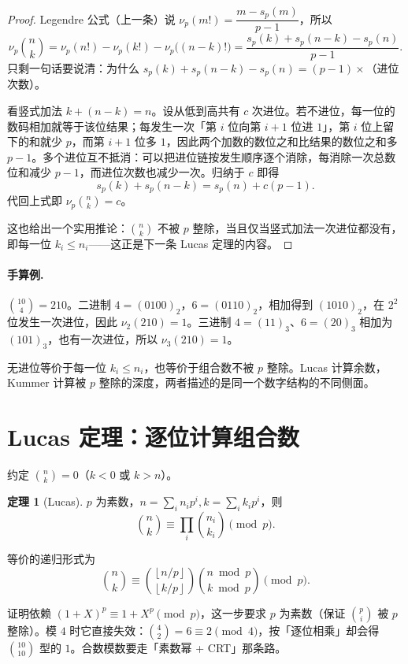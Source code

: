 \documentclass[UTF8,a4paper,11pt,oneside,openany,fontset=fandol]{ctexbook}
\theoremstyle{definition}
\newtheorem{theorem}[definition]{定理}
\newcommand{\floor}[1]{\left\lfloor #1\right\rfloor}
\begin{document}
\begin{proof}
Legendre 公式（上一条）说 $\nu_p(m!)=\dfrac{m-s_p(m)}{p-1}$，所以
\[
 \nu_p\binom{n}{k}=\nu_p(n!)-\nu_p(k!)-\nu_p\big((n-k)!\big)
 =\frac{s_p(k)+s_p(n-k)-s_p(n)}{p-1}.
\]
只剩一句话要说清：为什么 $s_p(k)+s_p(n-k)-s_p(n)=(p-1)\times$（进位次数）。

看竖式加法 $k+(n-k)=n$。设从低到高共有 $c$ 次进位。若不进位，每一位的数码相加就等于该位结果；每发生一次「第 $i$ 位向第 $i+1$ 位进 $1$」，第 $i$ 位上留下的和就少 $p$，而第 $i+1$ 位多 $1$，因此两个加数的数位之和比结果的数位之和多 $p-1$。多个进位互不抵消：可以把进位链按发生顺序逐个消除，每消除一次总数位和减少 $p-1$，而进位次数也减少一次。归纳于 $c$ 即得
\[
 s_p(k)+s_p(n-k)=s_p(n)+c(p-1).
\]
代回上式即 $\nu_p\binom nk=c$。

这也给出一个实用推论：$\binom nk$ 不被 $p$ 整除，当且仅当竖式加法一次进位都没有，即每一位 $k_i\le n_i$——这正是下一条 Lucas 定理的内容。
\end{proof}
\paragraph{手算例.} $\binom{10}{4}=210$。二进制 $4=(0100)_2$，$6=(0110)_2$，相加得到 $(1010)_2$，在 $2^2$ 位发生一次进位，因此 $\nu_2(210)=1$。三进制 $4=(11)_3$、$6=(20)_3$ 相加为 $(101)_3$，也有一次进位，所以 $\nu_3(210)=1$。
\begin{teach}
无进位等价于每一位 $k_i\le n_i$，也等价于组合数不被 $p$ 整除。Lucas 计算余数，Kummer 计算被 $p$ 整除的深度，两者描述的是同一个数字结构的不同侧面。
\end{teach}


\section{Lucas 定理：逐位计算组合数}
约定 $\binom nk=0$（$k<0$ 或 $k>n$）。
\begin{theorem}[Lucas]
$p$ 为素数，$n=\sum_i n_ip^i,k=\sum_i k_ip^i$，则
\[
 \binom nk\equiv\prod_i\binom{n_i}{k_i}\pmod p.
\]


等价的递归形式为
\[
 \binom nk\equiv\binom{\floor{n/p}}{\floor{k/p}}
 \binom{n\bmod p}{k\bmod p}\pmod p.
\]
\end{theorem}

\begin{tip}
证明依赖 $(1+X)^p\equiv1+X^p\pmod p$，这一步要求 $p$ 为素数（保证 $\binom pi$ 被 $p$ 整除）。模 $4$ 时它直接失效：$\binom42=6\equiv2\pmod4$，按「逐位相乘」却会得 $\binom{10}{10}$ 型的 $1$。合数模数要走「素数幂 + CRT」那条路。
\end{tip}
\end{document}

